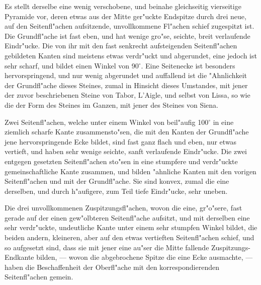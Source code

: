 \documentclass[a4paper, 11pt, oneside, german]{article}
\begin{document}
Es stellt derselbe eine wenig verschobene, und beinahe gleichseitig vierseitige Pyramide vor, deren etwas aus der Mitte ger"uckte Endspitze durch drei neue, auf den Seitenfl"achen aufsitzende, unvollkommene Fl"achen schief zugespitzt ist. Die Grundfl"ache ist fast eben, und hat wenige gro"se, seichte, breit verlaufende Eindr"ucke. Die von ihr mit den fast senkrecht aufsteigenden Seitenfl"achen gebildeten Kanten sind meistens etwas verdr"uckt und abgerundet, eine jedoch ist sehr scharf, und bildet einen Winkel von 90$^{\circ}$. Eine Seitenecke ist besonders hervorspringend, und nur wenig abgerundet und auffallend ist die "Ahnlichkeit der Grundfl"ache dieses Steines, zumal in Hinsicht dieses Umstandes, mit jener der zuvor beschriebenen Steine von Tabor, L'Aigle, und selbst von Lissa, so wie die der Form des Steines im Ganzen, mit jener des Steines von Siena.

Zwei Seitenfl"achen, welche unter einem Winkel von beil"aufig 100$^{\circ}$ in eine ziemlich scharfe Kante zusammensto"sen, die mit den Kanten der Grundfl"ache jene hervorspringende Ecke bildet, sind fast ganz flach und eben, nur etwas vertieft, und haben sehr wenige seichte, sanft verlaufende Eindr"ucke. Die zwei entgegen gesetzten Seitenfl"achen sto"sen in eine stumpfere und verdr"uckte gemeinschaftliche Kante zusammen, und bilden "ahnliche Kanten mit den vorigen Seitenfl"achen und mit der Grundfl"ache. Sie sind konvex, zumal die eine derselben, und durch h"aufigere, zum Teil tiefe Eindr"ucke, sehr uneben.

Die drei unvollkommenen Zuspitzungsfl"achen, wovon die eine, gr"o"sere, fast gerade auf der einen gew"olbteren Seitenfl"ache aufsitzt, und mit derselben eine sehr verdr"uckte, undeutliche Kante unter einem sehr stumpfen Winkel bildet, die beiden andern, kleineren, aber auf den etwas vertieften Seitenfl"achen schief, und so aufgesetzt sind, dass sie mit jener eine au"ser die Mitte fallende Zuspitzungs-Endkante bilden, --- wovon die abgebrochene Spitze die eine Ecke ausmachte, --- haben die Beschaffenheit der Oberfl"ache mit den korrespondierenden Seitenfl"achen gemein.
\end{document}
